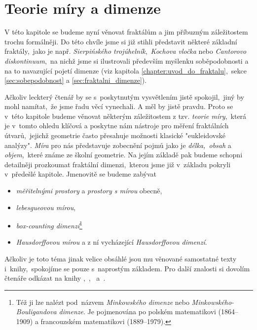 \chapter{Teorie míry a dimenze}\label{chapter:teorie-miry-a-dimenze}

V této kapitole se budeme nyní věnovat fraktálům a jim příbuzným záležitostem trochu formálněji. Do této chvíle jsme si již stihli představit některé základní fraktály,~jako je např. \emph{Sierpińského trojúhelník},~\emph{Kochova vločka} nebo \emph{Cantorovo diskontinuum},~na nichž jsme si ilustrovali především myšlenku soběpodobnosti a na to navazující pojetí dimenze (viz kapitola \ref{chapter:uvod_do_fraktalu},~sekce \ref{sec:sobepodobnost} a \ref{sec:fraktalni_dimenze}).

Ačkoliv leckterý čtenář by se s~poskytnutým vysvětlením jistě spokojil,~jiný by mohl namítat,~že jsme řadu věcí vynechali. A měl by jistě pravdu. Proto se v~této kapitole budeme věnovat některým záležitostem z tzv. \emph{teorie míry},~která je v~tomto ohledu klíčová a poskytne nám nástroje pro měření fraktálních útvarů,~jejichž geometrie často přesahuje možnosti klasické "eukleidovské analýzy". \emph{Míra} pro nás představuje zobecnění pojmů jako je \emph{délka,~obsah} a \emph{objem},~které známe ze školní geometrie. Na jejím základě pak budeme schopni detailněji prozkoumat fraktální dimenzi,~kterou jsme již v~základu pokryli v~předešlé kapitole. Jmenovitě se budeme zabývat
\begin{itemize}
    \item \emph{měřitelnými prostory} a \emph{prostory s mírou} obecně,
    \item \emph{lebesgueovou mírou},
    \item \emph{box-counting dimenzí}\footnote{Též ji lze nalézt pod~názvem \emph{Minkowského dimenze} nebo \emph{Minkowského-Bouligandova dimenze}. Je pojmenována po polském matematikovi  (1864--1909) a francouzském matematikovi  (1889--1979).}
    \item \emph{Hausdorffovou mírou} a z ní vycházející \emph{Hausdorffovou dimenzí}.
\end{itemize}

Ačkoliv je toto téma jinak velice obsáhlé jsou mu věnované samostatné texty i~knihy,~spokojíme se pouze s~naprostým základem. Pro další znalosti si dovolím čtenáře odkázat na knihy \cite{Falconer2014},~\cite{Lukes2013},~\cite{Netuka2016} a~\cite{Edgar2008}.

